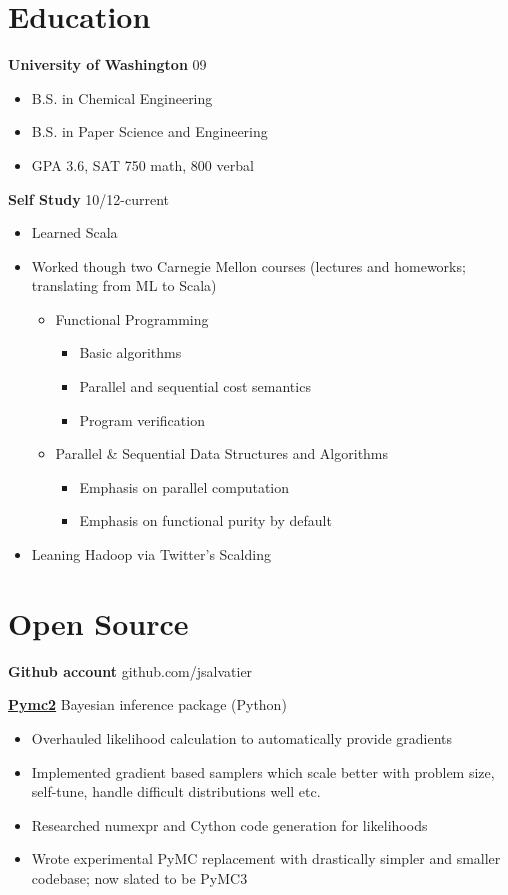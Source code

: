 \documentclass[margin]{res}
\newcommand{\bactivity}[3]{
  {\bf #1} #2 \hfill #3
    \vspace{6pt}
    \begin{itemize} \itemsep -2pt
      }
\newcommand{\eactivity}[0]{\end{itemize}}
\newcommand{\bitem}{\begin{itemize} \itemsep -2pt}
\newcommand{\eitem}{\end{itemize} }
\begin{document}
\begin{resume}
\section{Education} 
  \bactivity{University of Washington}{}{09}
      \item B.S. in Chemical Engineering
      \item B.S. in Paper Science and Engineering
      \item GPA 3.6, SAT 750 math, 800 verbal
  \eactivity
  \bactivity{Self Study}{}{10/12-current}
      \item Learned Scala 
      \item Worked though two Carnegie Mellon courses (lectures and homeworks; translating from ML to Scala)
      \bitem
        \item Functional Programming 
        \bitem
            \item Basic algorithms
            \item Parallel and sequential cost semantics
            \item Program verification
        \eitem
        \item Parallel \& Sequential Data Structures and Algorithms 
        \bitem 
          \item Emphasis on parallel computation
          \item Emphasis on functional purity by default
        \eitem
      \eitem
      \item Leaning Hadoop via Twitter's Scalding
    \eactivity
    
   
  \section{Open Source}
    {\bf Github account} github.com/jsalvatier 

    \bactivity{\href{https://github.com/pymc-devs/pymc\#readme}{Pymc2} }{Bayesian inference package (Python)}{}
      \item Overhauled likelihood calculation to automatically provide gradients 
      \item Implemented gradient based samplers which scale better with problem size, self-tune, handle difficult distributions well etc.
      \item Researched numexpr and Cython code generation for likelihoods
      \item Wrote experimental PyMC replacement with drastically simpler and smaller codebase; now slated to be PyMC3
    \eactivity


\end{resume}
\end{document}
